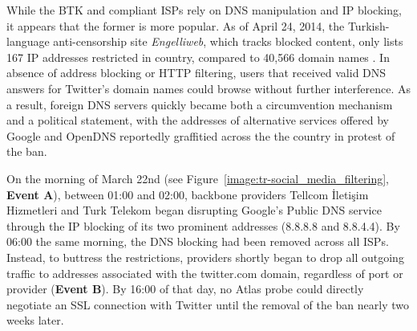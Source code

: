While the BTK and compliant ISPs rely on DNS manipulation and IP blocking, it
appears that the former is more popular.  As of April 24, 2014, the
Turkish-language anti-censorship site \textit{Engelliweb}, which tracks
blocked content, only lists 167 IP addresses restricted in
country, compared to 40,566 domain names \cite{engelliweb}.
In absence of address blocking or HTTP filtering, users that received valid DNS
answers for Twitter's domain names could browse without further interference.
As a result, foreign DNS servers quickly became both a circumvention mechanism
and a political statement, with the addresses of alternative services offered
by Google and OpenDNS reportedly graffitied across the the country in protest
of the ban.

On the morning of March 22nd (see Figure~\ref{image:tr-social_media_filtering},
\textbf{Event A}), between 01:00 and 02:00, backbone providers Tellcom \.{I}leti\c{s}im
Hizmetleri and Turk Telekom began disrupting Google's Public DNS service
through the IP blocking of its two prominent addresses (8.8.8.8 and 8.8.4.4).
By 06:00 the same morning, the DNS blocking had been removed across all ISPs.
Instead, to buttress the restrictions, providers shortly began to drop all
outgoing traffic to addresses associated with the twitter.com domain,
regardless of port or provider (\textbf{Event B}). By 16:00 of that
day, no Atlas probe could directly negotiate an SSL connection with Twitter
until the removal of the ban nearly two weeks later.

